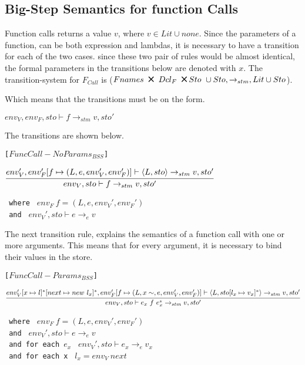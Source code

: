 \subsection{Big-Step Semantics for function Calls}
Function calls returns a value $v$, where $v \in Lit \cup {none}$.
Since the parameters of a function, can be both expression and lambdas, it is necessary to have a transition for each of the two cases.
since these two pair of rules would be almost identical, the formal parameters in the transitions below are denoted with $x$.
The transition-system for $F_{Call}$ is ($Fnames\ \Cross\ Dcl_F\ \Cross Sto\ \cup Sto, \rightarrow_{stm}, Lit \cup Sto$).

Which means that the transitions must be on the form.
\begin{center}
	$env_V, env_F, sto \vdash f \rightarrow_{stm} v, sto'$
\end{center}
The transitions are shown below.

\texttt{[$FuncCall-NoParams_{BSS}$]}\\
\begin{center}
	\begin{math}
	\cfrac
		{env_V', env_F'[f \mapsto (L, e, env_V', env_F')] \vdash \langle L, sto \rangle \rightarrow_{stm} v, sto'}
		{env_V, sto \vdash f \rightarrow_{stm} v, sto'}
	\end{math}
	
	\texttt{ where } $env_F\ f = (L, e, env_V', env_F')$\\
	\texttt{ and } $ env_V', sto \vdash e \rightarrow_{e} v$\\
\end{center}

The next transition rule, explains the semantics of a function call with one or more arguments.
This means that for every argument, it is necessary to bind their values in the store.

\texttt{[$FuncCall-Params_{BSS}$]}\\
\begin{center}
	\begin{math}
	\cfrac
	{env_V'[x \mapsto l]^*[next \mapsto new\ l_x]^*, env_F'[f \mapsto (L, x\sim, e, env_V', env_F')] \vdash \langle L, sto[l_x \mapsto v_x]^* \rangle \rightarrow_{stm} v, sto'}
	{env_V, sto \vdash e_x\ f\ e_x^* \rightarrow_{stm} v, sto'}
	\end{math}
	
	\texttt{ where } $env_F\ f = (L, e, env_V', env_F')$\\
	\texttt{ and } $ env_V', sto \vdash e \rightarrow_{e} v$\\
	\texttt{ and for each $e_x$ } $env_V', sto \vdash e_x \rightarrow_{e} v_x$ \\
	\texttt{ and for each x } $l_x = env_V\ next$ 
\end{center}

